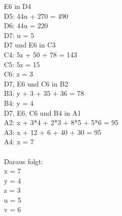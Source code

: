 \documentclass{article}
\begin{document}
	E6 in D4 \\
	D5: 44u + 270 = 490\\
	D6: 44u = 220\\
	D7: u = 5 \\
	D7 und E6 in C3 \\
	C4: 5z + 50 + 78 = 143 \\
	C5: 5z = 15 \\
	C6: z = 3 \\
	D7, E6 und C6 in B2 \\
	B3: y  + 3   + 35  + 36 = 78 \\
	B4: y  = 4 \\
	D7, E6, C6 und B4 in A1 \\
	A2: x + 3*4 + 2*3 + 8*5 + 5*6 = 95 \\
	A3: x + 12 + 6 + 40 + 30 = 95 \\
	A4: x = 7 \\ \\
	Daraus folgt: \\
	x = 7 \\
	y = 4 \\
	z = 3 \\
	u = 5 \\
	v = 6
	
\end{document}
